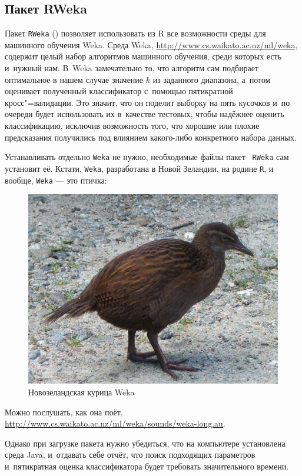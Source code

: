 \documentclass[final,pdftex]{../../template/epsilonj}\usepackage[]{graphicx}\usepackage[]{color}
\begin{document}
\subsection{Пакет RWeka} 

Пакет \texttt{RWeka} (\cite{RWekapackage14}) позволяет использовать из R все возможности среды для машинного обучения Weka. Среда Weka, \url{http://www.cs.waikato.ac.nz/ml/weka}, содержит целый набор алгоритмов машинного обучения, среди которых есть и~нужный нам. 
В~Weka замечательно то, что алгоритм сам подбирает оптимальное в нашем случае значение $k$ из заданного диапазона, а~потом оценивает полученный классификатор с~помощью пятикратной кросс"=валидации. 
Это значит, что он поделит выборку на пять кусочков и~по очереди будет использовать их в~качестве тестовых, чтобы надёжнее оценить классификацию, исключив возможность того, что хорошие или плохие предсказания получились под влиянием какого-либо конкретного набора данных. 

Устанавливать отдельно \texttt{Weka} не нужно, необходимые файлы пакет \texttt{
RWeka} сам установит её. Кстати, \texttt{Weka}, разработана в Новой Зеландии, на родине \texttt{R}, и вообще, \texttt{Weka} --- это птичка:

\begin{figure}[hbtp]
\caption{Новозеландская курица Weka}
\centering
\includegraphics[scale=0.2]{SI_Weka.jpg}
\end{figure}

Можно послушать, как она поёт, \url{http://www.cs.waikato.ac.nz/ml/weka/sounds/weka-long.au}.


Однако при загрузке пакета нужно убедиться, что на компьютере установлена среда Java, и~отдавать себе отчёт, что поиск подходящих параметров и~пятикратная оценка классификатора будет требовать значительного времени.
\end{document}
